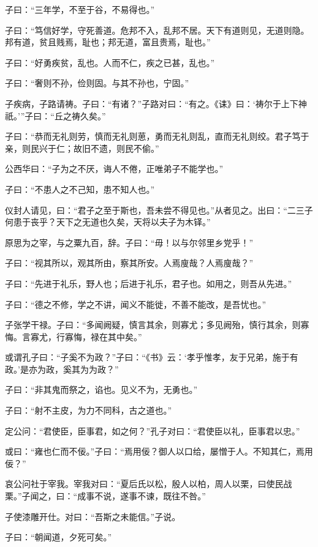 \documentclass[a5paper]{ctexbook}
\begin{document}
    

    子曰：“三年学，不至于谷，不易得也。”

    子曰：“笃信好学，守死善道。危邦不入，乱邦不居。天下有道则见，无道则隐。邦有道，贫且贱焉，耻也；邦无道，富且贵焉，耻也。”

    子曰：“好勇疾贫，乱也。人而不仁，疾之已甚，乱也。”

    子曰：“奢则不孙，俭则固。与其不孙也，宁固。”

    子疾病，子路请祷。子曰：“有诸？”子路对曰：“有之。《诔》曰：‘祷尔于上下神祇。’”子曰：“丘之祷久矣。”

    子曰：“恭而无礼则劳，慎而无礼则葸，勇而无礼则乱，直而无礼则绞。君子笃于亲，则民兴于仁；故旧不遗，则民不偷。”
    
    公西华曰：“子为之不厌，诲人不倦，正唯弟子不能学也。”

    子曰：“不患人之不己知，患不知人也。”

    仪封人请见，曰：“君子之至于斯也，吾未尝不得见也。”从者见之。出曰：“二三子何患于丧乎？天下之无道也久矣，天将以夫子为木铎。”

    原思为之宰，与之粟九百，辞。子曰：“毋！以与尔邻里乡党乎！”

    子曰：“视其所以，观其所由，察其所安。人焉廋哉？人焉廋哉？”

    子曰：“先进于礼乐，野人也；后进于礼乐，君子也。如用之，则吾从先进。”

    子曰：“德之不修，学之不讲，闻义不能徙，不善不能改，是吾忧也。”

    子张学干禄。子曰：“多闻阙疑，慎言其余，则寡尤；多见阙殆，慎行其余，则寡悔。言寡尤，行寡悔，禄在其中矣。”

    或谓孔子曰：“子奚不为政？”子曰：“《书》云：‘孝乎惟孝，友于兄弟，施于有政。’是亦为政，奚其为为政？”

    子曰：“非其鬼而祭之，谄也。见义不为，无勇也。”

    子曰：“射不主皮，为力不同科，古之道也。”

    

    定公问：“君使臣，臣事君，如之何？”孔子对曰：“君使臣以礼，臣事君以忠。”

    或曰：“雍也仁而不佞。”子曰：“焉用佞？御人以口给，屡憎于人。不知其仁，焉用佞？”

    哀公问社于宰我。宰我对曰：“夏后氏以松，殷人以柏，周人以栗，曰使民战栗。”子闻之，曰：“成事不说，遂事不谏，既往不咎。”

    子使漆雕开仕。对曰：“吾斯之未能信。”子说。
    
    子曰：“朝闻道，夕死可矣。”
    
\end{document}
